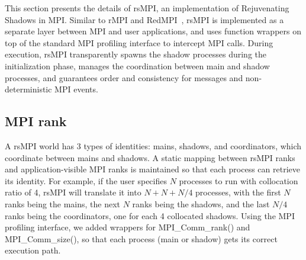 This section presents the details of rsMPI, an implementation of Rejuvenating Shadows in MPI. 
Similar to rMPI and RedMPI~\cite{ferreira_sc_2011,fiala_2012_sdc}, rsMPI is implemented as a separate layer between MPI and user applications, and uses function wrappers on top of the standard MPI profiling interface to intercept MPI calls. 
During execution, rsMPI transparently spawns the shadow processes during the initialization phase, manages the coordination between main and shadow processes, and guarantees order and consistency for messages and non-deterministic MPI events.

\subsection{MPI rank}
A rsMPI world has 3 types of identities: mains, shadows, and coordinators, which coordinate between mains and shadows. A static mapping between rsMPI ranks and application-visible MPI ranks is maintained so that each process can retrieve its identity. For example, if the user specifies $N$ processes to run with collocation ratio of 4, rsMPI will translate it into $N + N + N/4$ processes, %
with the first $N$ ranks being the mains, the next $N$ ranks being the shadows, and the last $N/4$ ranks being the coordinators, one for each 4 collocated shadows. 
Using the MPI profiling interface, we added wrappers for MPI\_Comm\_rank() and MPI\_Comm\_size(), so that each process (main or shadow) gets its correct execution path.


